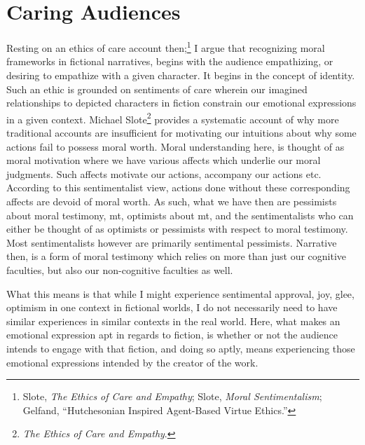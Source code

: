 \documentclass[phdthesis,12pt,final,a4paper]{wuthesis}
\theoremstyle{definition}
\theoremstyle{definition}
\theoremstyle{definition}
\theoremstyle{definition}
\theoremstyle{remark}
\begin{document}
\section{Caring Audiences}\label{caring-audiences}

Resting on an ethics of care account then;\footnote{Slote, \emph{The {Ethics} of {Care} and {Empathy}}; Slote, \emph{Moral {Sentimentalism}}; Gelfand, {``Hutchesonian Inspired Agent-Based Virtue Ethics.''}} I argue that recognizing moral frameworks in fictional narratives, begins with the audience empathizing, or desiring to empathize with a given character. It begins in the concept of identity. Such an ethic is grounded on sentiments of care wherein our imagined relationships to depicted characters in fiction constrain our emotional expressions in a given context. Michael Slote\footnote{\emph{The {Ethics} of {Care} and {Empathy}}.} provides a systematic account of why more traditional accounts are insufficient for motivating our intuitions about why some actions fail to possess moral worth. Moral understanding here, is thought of as moral motivation where we have various affects which underlie our moral judgments. Such affects motivate our actions, accompany our actions etc. According to this sentimentalist view, actions done without these corresponding affects are devoid of moral worth. As such, what we have then are pessimists about moral testimony, mt, optimists about mt, and the sentimentalists who can either be thought of as optimists or pessimists with respect to moral testimony. Most sentimentalists however are primarily sentimental pessimists. Narrative then, is a form of moral testimony which relies on more than just our cognitive faculties, but also our non-cognitive faculties as well.

What this means is that while I might experience sentimental approval, joy, glee, optimism in one context in fictional worlds, I do not necessarily need to have similar experiences in similar contexts in the real world. Here, what makes an emotional expression apt in regards to fiction, is whether or not the audience intends to engage with that fiction, and doing so aptly, means experiencing those emotional expressions intended by the creator of the work.
\end{document}

